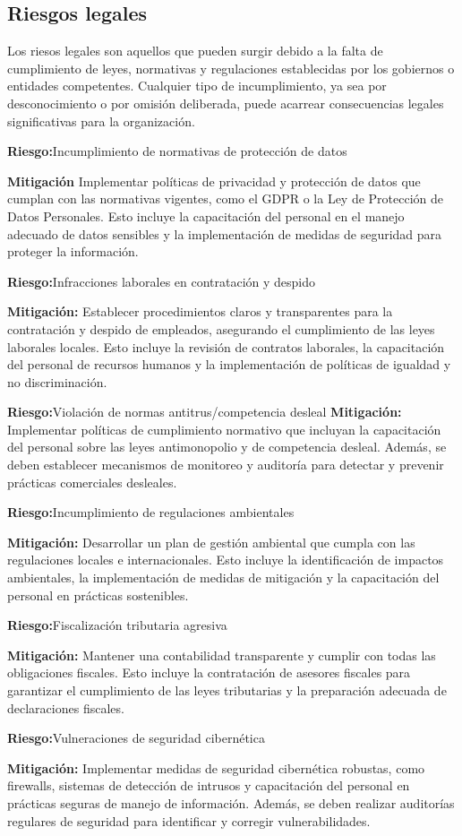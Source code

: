 \subsection{Riesgos legales}
Los riesos legales son aquellos que pueden surgir debido a la falta de cumplimiento de leyes, normativas y regulaciones establecidas por los gobiernos o entidades competentes. Cualquier tipo de incumplimiento, ya sea por desconocimiento o por omisión deliberada, puede acarrear consecuencias legales significativas para la organización.

\textbf{Riesgo:}Incumplimiento de normativas de protección de datos 

\textbf{Mitigación} Implementar políticas de privacidad y protección de datos que cumplan con las normativas vigentes, como el GDPR o la Ley de Protección de Datos Personales. Esto incluye la capacitación del personal en el manejo adecuado de datos sensibles y la implementación de medidas de seguridad para proteger la información.

\textbf{Riesgo:}Infracciones laborales en contratación y despido

\textbf{Mitigación:} Establecer procedimientos claros y transparentes para la contratación y despido de empleados, asegurando el cumplimiento de las leyes laborales locales. Esto incluye la revisión de contratos laborales, la capacitación del personal de recursos humanos y la implementación de políticas de igualdad y no discriminación.

\textbf{Riesgo:}Violación de normas antitrus/competencia desleal
\textbf{Mitigación:} Implementar políticas de cumplimiento normativo que incluyan la capacitación del personal sobre las leyes antimonopolio y de competencia desleal. Además, se deben establecer mecanismos de monitoreo y auditoría para detectar y prevenir prácticas comerciales desleales.

\textbf{Riesgo:}Incumplimiento de regulaciones ambientales

\textbf{Mitigación:} Desarrollar un plan de gestión ambiental que cumpla con las regulaciones locales e internacionales. Esto incluye la identificación de impactos ambientales, la implementación de medidas de mitigación y la capacitación del personal en prácticas sostenibles.

\textbf{Riesgo:}Fiscalización tributaria agresiva

\textbf{Mitigación:} Mantener una contabilidad transparente y cumplir con todas las obligaciones fiscales. Esto incluye la contratación de asesores fiscales para garantizar el cumplimiento de las leyes tributarias y la preparación adecuada de declaraciones fiscales.

\textbf{Riesgo:}Vulneraciones de seguridad cibernética

\textbf{Mitigación:} Implementar medidas de seguridad cibernética robustas, como firewalls, sistemas de detección de intrusos y capacitación del personal en prácticas seguras de manejo de información. Además, se deben realizar auditorías regulares de seguridad para identificar y corregir vulnerabilidades.
